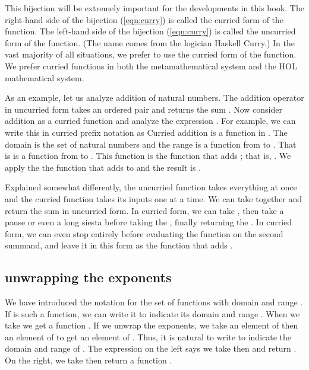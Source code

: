\documentclass[cup9a]{cupbook}
\begin{document}
This bijection will be extremely important for the developments in this book.  The right-hand side of the bijection (\ref{eqn:curry}) is called the curried form of the function.  The left-hand side of the bijection (\ref{eqn:curry}) is called the uncurried form of the function.  (The name comes from the logician Haskell Curry.)   In the vast majority of all situations, we prefer to use the curried form of the function.  We prefer curried functions in both the metamathematical system and the HOL mathematical system.

As an example, let us analyze addition of natural numbers.  The addition operator in uncurried form takes an ordered pair  and
returns the sum .   Now consider addition as a curried function and analyze the expression .  For example, we can write this in curried prefix notation as
Curried addition is a function in .  The domain
is the set of natural numbers and the range is a function from  to .
That is  is a function from  to .  This function is the function that adds ; that is, .  We apply the
the function that adds  to  and the result is .

Explained somewhat differently, the uncurried function takes everything at once and the curried function takes its inputs one at a time.  We can take  together and return the sum  in uncurried form.  In curried form, we can take , then take a pause or even a long siesta before taking the , finally returning the .  In curried form, we can even stop entirely before evaluating the function  on the second summand, and leave it in this form as the function that adds .

\subsection{unwrapping the exponents}

We have introduced the notation  for the set of functions with domain  and range .    If  is such a function, we can write it
 to indicate its domain  and range .  When we take
 we get a function .  If we unwrap the exponents, we
take an element of  then an element of  to get an element of .
Thus, it is natural to write
to indicate the domain and range of .  The expression on the left
says we take  then  and return .  On the
right, we take  then return a function .
\end{document}
